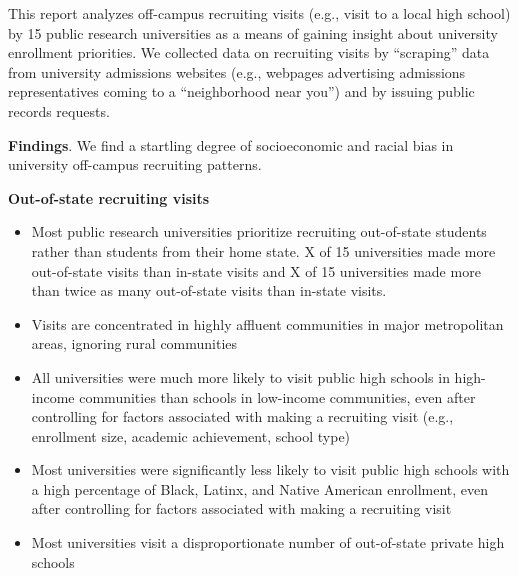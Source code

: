 \documentclass[twoside]{article}
\begin{document}

This report analyzes off-campus recruiting visits (e.g., visit to a local high school) by 15 public research universities as a means of gaining insight about university enrollment priorities. We collected data on recruiting visits by ``scraping'' data from university admissions websites (e.g., webpages advertising admissions representatives coming to a ``neighborhood near you'') and by issuing public records requests.

\textbf{Findings}. We find a startling degree of socioeconomic and racial bias in university off-campus recruiting patterns.

\textbf{Out-of-state recruiting visits}
\begin{itemize}
    \item Most public research universities prioritize recruiting out-of-state students rather than students from their home state.  X of 15 universities made more out-of-state visits than in-state visits and X of 15 universities made more than twice as many out-of-state visits than in-state visits.
    \item Visits are concentrated in highly affluent communities in major metropolitan areas, ignoring rural communities
    \item All universities were much more likely to visit public high schools in high-income communities than schools in low-income communities, even after controlling for factors associated with making a recruiting visit (e.g., enrollment size, academic achievement, school type)
    \item Most universities were significantly less likely to visit public high schools with a high percentage of Black, Latinx, and Native American enrollment, even after controlling for factors associated with making a recruiting visit
    \item Most universities visit a disproportionate number of out-of-state private high schools
\end{itemize}
\end{document}
